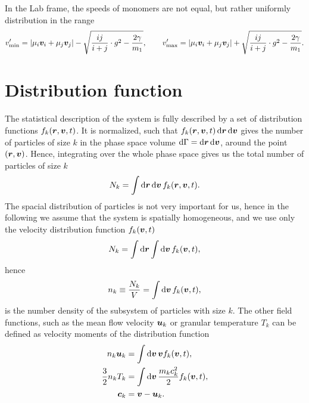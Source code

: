 \documentclass[aps,prl,preprint,groupedaddress,10pt]{revtex4-2}
\begin{document}
In the Lab frame, the speeds of monomers are not equal, but rather uniformly 
distribution in the range 
\begin{equation}
    v'_{\mathrm{min}}=\abs{\mu_i\vb*{v}_i+\mu_j\vb*{v}_j}-
    \sqrt{\frac{ij}{i+j}\cdot g^2-\frac{2\gamma}{m_1}},\qquad
    v'_{\mathrm{max}}=\abs{\mu_i\vb*{v}_i+\mu_j\vb*{v}_j}+
    \sqrt{\frac{ij}{i+j}\cdot g^2-\frac{2\gamma}{m_1}}.
\end{equation}

\section{Distribution function}
The statistical description of the system is fully described by a set of distribution
functions $f_k\pqty{\br,\bv,t}$. It is normalized, such that 
$f_k\pqty{\br,\bv,t}\dd{\br}\dd{\bv}$ gives the number of particles of size $k$
in the phase space volume $\dd{\Gamma}=\dd{\vb*{r}}\dd{\vb*{v}}$, around the point 
$\pqty{\br,\bv}$. Hence, integrating over the whole phase space gives us the total
number of particles of size $k$
\begin{equation}
    N_k=\int\dd{\br}\dd{\bv}f_k\pqty{\br,\bv,t}.
\end{equation}
The spacial distribution of particles is not very important for us, hence in the following
we assume that the system is spatially homogeneous, and we use only the velocity
distribution function $f_k\pqty{\bv,t}$
\begin{equation}
    N_k=\int\dd{\br}\int\dd{\bv}f_k\pqty{\bv,t},
\end{equation}
hence 
\begin{equation}
    n_k\equiv\frac{N_k}{V}=\int\dd{\bv}f_k\pqty{\bv,t},
\end{equation}
is the number density of the subsystem of particles with size $k$. The other field 
functions, such as the mean flow velocity $\vb*{u}_k$ or granular temperature $T_k$ 
can be defined as velocity moments of the distribution function
\begin{equation}
    \begin{split}
        n_k\bu_k &= \int\dd{\bv}\bv f_k\pqty{\bv,t},\\
        \frac{3}{2}n_kT_k &=\int\dd{\bv}\frac{m_kc_k^2}{2}f_k\pqty{\bv,t},\\
        \bc_k &= \bv-\bu_k.
    \end{split}
\end{equation}
\end{document}

